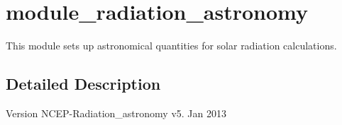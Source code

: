 \hypertarget{group__module__radiation__astronomy}{}\section{module\+\_\+radiation\+\_\+astronomy}
\label{group__module__radiation__astronomy}


This module sets up astronomical quantities for solar radiation calculations.  




\subsection{Detailed Description}
\begin{DoxyVersion}{Version}
N\+C\+E\+P-\/\+Radiation\+\_\+astronomy v5. Jan 2013 
\end{DoxyVersion}
